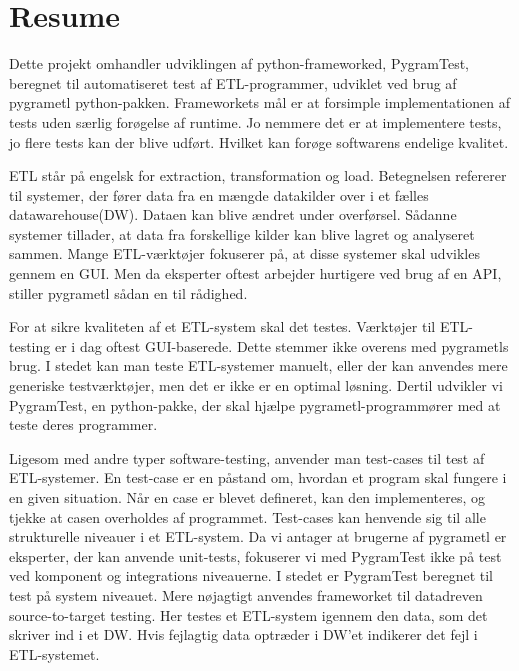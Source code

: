 \section*{Resume}
\setcounter{page}{0}
Dette projekt omhandler udviklingen af python-frameworked, PygramTest, beregnet til automatiseret test af ETL-programmer, udviklet ved brug af pygrametl python-pakken. Frameworkets mål er at forsimple implementationen af tests uden særlig forøgelse af runtime. Jo nemmere det er at implementere tests, jo flere tests kan der blive udført. Hvilket kan forøge softwarens endelige kvalitet.  

ETL står på engelsk for extraction, transformation og load. Betegnelsen refererer til systemer, der fører data fra en mængde datakilder over i et fælles datawarehouse(DW). Dataen kan blive ændret  under overførsel. Sådanne systemer tillader, at data fra forskellige kilder kan blive lagret og analyseret sammen. Mange ETL-værktøjer fokuserer på, at disse systemer skal udvikles gennem en GUI. Men da eksperter oftest arbejder hurtigere ved brug af en API, stiller pygrametl sådan en til rådighed.   

For at sikre kvaliteten af et ETL-system skal det testes. Værktøjer til ETL-testing er i dag oftest GUI-baserede. Dette stemmer ikke overens med pygrametls brug. I stedet kan man teste ETL-systemer manuelt, eller der kan anvendes mere generiske testværktøjer, men det er ikke er en optimal løsning. Dertil udvikler vi PygramTest, en python-pakke, der skal hjælpe pygrametl-programmører med at teste deres programmer.

Ligesom med andre typer software-testing, anvender man test-cases til test af  ETL-systemer. En test-case er en påstand om, hvordan et program skal fungere i en given situation. Når en case er blevet defineret, kan den implementeres, og tjekke at casen overholdes af programmet. Test-cases kan henvende sig til alle strukturelle niveauer i et ETL-system. Da vi antager at brugerne af pygrametl er eksperter, der kan anvende unit-tests, fokuserer vi med PygramTest ikke på test ved komponent og integrations niveauerne. I stedet er PygramTest beregnet til test på system niveauet. Mere nøjagtigt anvendes frameworket til datadreven source-to-target testing. Her testes et ETL-system igennem den data, som det skriver ind i et DW. Hvis fejlagtig data optræder i DW’et indikerer det fejl i ETL-systemet. 

